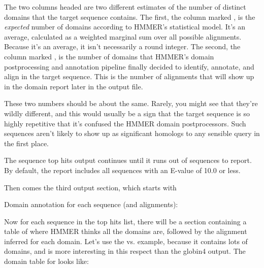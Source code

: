 The two columns headed  are two different estimates of
the number of distinct domains that the target sequence contains. The
first, the column marked , is the \emph{expected} number of
domains according to HMMER's statistical model. It's an average,
calculated as a weighted marginal sum over all possible
alignments. Because it's an average, it isn't necessarily a round
integer. The second, the column marked , is the number of
domains that HMMER's domain postprocessing and annotation pipeline
finally decided to identify, annotate, and align in the target
sequence. This is the number of alignments that will show up in the
domain report later in the output file.

These two numbers should be about the same. Rarely, you might see that
they're wildly different, and this would usually be a sign that the
target sequence is so highly repetitive that it's confused the HMMER
domain postprocessors. Such sequences aren't likely to show up as
significant homologs to any sensible query in the first place.

The sequence top hits output continues until it runs out of sequences
to report. By default, the report includes all sequences with an
E-value of 10.0 or less. 

Then comes the third output section, which starts with

\begin{sreoutput}
Domain annotation for each sequence (and alignments):
\end{sreoutput}

Now for each sequence in the top hits list, there will be a section 
containing a table of where HMMER thinks all the domains are,
followed by the alignment inferred for each domain. Let's use the
 vs.  example, because it contains lots
of domains, and is more interesting in this respect than the globin4
output.  The domain table for  looks like:

